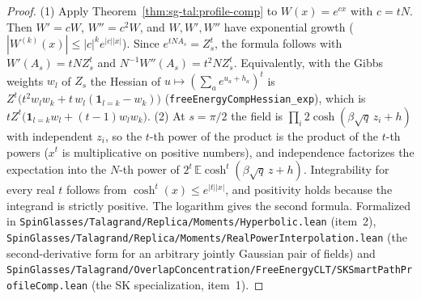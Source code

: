 \begin{proof}
  \leanok
(1) Apply Theorem~\ref{thm:sg-tal:profile-comp} to $W(x)=e^{cx}$ with $c=tN$. Then $W'=cW$, $W''=c^2W$, and $W,W',W''$ have exponential growth ($|W^{(k)}(x)|\le|c|^ke^{|c||x|}$). Since $e^{tNA_s}=Z_s^t$, the formula follows with $W'(A_s)=tNZ_s^t$ and $N^{-1}W''(A_s)=t^2NZ_s^t$. Equivalently, with the Gibbs weights $w_l$ of $Z_s$ the Hessian of $u\mapsto(\sum_a e^{u_a+h_a})^t$ is $Z^t\big(t^2w_lw_k+t\,w_l(\mathbf 1_{l=k}-w_k)\big)$ (\texttt{freeEnergyCompHessian\_exp}), which is $tZ^t\big(\mathbf 1_{l=k}w_l+(t-1)w_lw_k\big)$.
(2) At $s=\pi/2$ the field is $\prod_i2\cosh(\beta\sqrt q\,z_i+h)$ with independent $z_i$, so the $t$-th power of the product is the product of the $t$-th powers ($x^t$ is multiplicative on positive numbers), and independence factorizes the expectation into the $N$-th power of $2^t\,\mathbb E\cosh^t(\beta\sqrt q\,z+h)$. Integrability for every real $t$ follows from $\cosh^t(x)\le e^{|t||x|}$, and positivity holds because the integrand is strictly positive. The logarithm gives the second formula.
Formalized in \texttt{SpinGlasses/Talagrand/Replica/Moments/Hyperbolic.lean} (item~2), \texttt{SpinGlasses/Talagrand/Replica/Moments/RealPowerInterpolation.lean} (the second-derivative form for an arbitrary jointly Gaussian pair of fields) and \texttt{SpinGlasses/Talagrand/OverlapConcentration/FreeEnergyCLT/SKSmartPathProfileComp.lean} (the SK specialization, item~1).
\end{proof}


